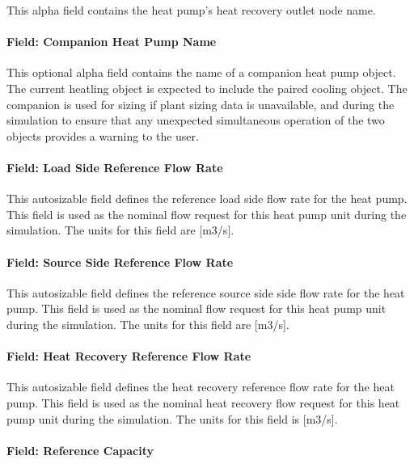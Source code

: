 This alpha field contains the heat pump's heat recovery outlet node name.

\paragraph{Field: Companion Heat Pump Name}\label{plhp_eir_heating_inputs_companion_name}

This optional alpha field contains the name of a companion heat pump object. The current heatling object is expected to include the paired cooling object. The companion is used for sizing if plant sizing data is unavailable, and during the simulation to ensure that any unexpected simultaneous operation of the two objects provides a warning to the user.

\paragraph{Field: Load Side Reference Flow Rate}\label{plhp_eir_heating_inputs_load_side_flow}

This autosizable field defines the reference load side flow rate for the heat pump. This field is used as the nominal flow request for this heat pump unit during the simulation. The units for this field are [m3/s].

\paragraph{Field: Source Side Reference Flow Rate}\label{plhp_eir_heating_inputs_source_side_flow}

This autosizable field defines the reference source side side flow rate for the heat pump. This field is used as the nominal flow request for this heat pump unit during the simulation. The units for this field are [m3/s].

\paragraph{Field: Heat Recovery Reference Flow Rate}\label{plhp_eir_heating_inputs_heat_recovery_flow}

This autosizable field defines the heat recovery reference flow rate for the heat pump. This field is used as the nominal heat recovery flow request for this heat pump unit during the simulation. The units for this field is [m3/s].

\paragraph{Field: Reference Capacity}\label{plhp_eir_heating_inputs_reference_capacity}

